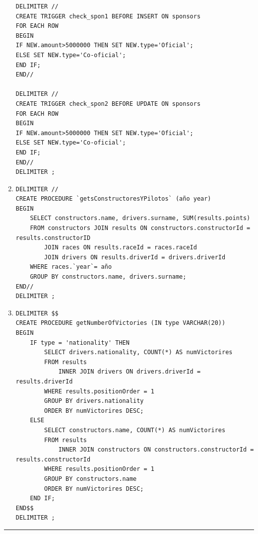 \documentclass[a4paper]{article}
\begin{document}
\begin{enumerate}
\begin{verbatim}
DELIMITER //
CREATE TRIGGER check_spon1 BEFORE INSERT ON sponsors
FOR EACH ROW
BEGIN
IF NEW.amount>5000000 THEN SET NEW.type='Oficial';
ELSE SET NEW.type='Co-oficial';
END IF;
END//

DELIMITER //
CREATE TRIGGER check_spon2 BEFORE UPDATE ON sponsors
FOR EACH ROW
BEGIN
IF NEW.amount>5000000 THEN SET NEW.type='Oficial';
ELSE SET NEW.type='Co-oficial';
END IF;
END//
DELIMITER ;    
    \end{verbatim}
    
    \item 
    \begin{verbatim}
DELIMITER //
CREATE PROCEDURE `getsConstructoresYPilotos` (año year)
BEGIN
    SELECT constructors.name, drivers.surname, SUM(results.points)
    FROM constructors JOIN results ON constructors.constructorId = results.constructorID
		JOIN races ON results.raceId = races.raceId
        JOIN drivers ON results.driverId = drivers.driverId
	WHERE races.`year`= año
    GROUP BY constructors.name, drivers.surname;
END//  
DELIMITER ;
    \end{verbatim}
    
    \item 
    \begin{verbatim}
DELIMITER $$
CREATE PROCEDURE getNumberOfVictories (IN type VARCHAR(20)) 
BEGIN
    IF type = 'nationality' THEN
        SELECT drivers.nationality, COUNT(*) AS numVictorires
        FROM results
            INNER JOIN drivers ON drivers.driverId = results.driverId
        WHERE results.positionOrder = 1
        GROUP BY drivers.nationality
        ORDER BY numVictorires DESC;
    ELSE 
        SELECT constructors.name, COUNT(*) AS numVictorires
        FROM results
            INNER JOIN constructors ON constructors.constructorId = results.constructorId
        WHERE results.positionOrder = 1
        GROUP BY constructors.name
        ORDER BY numVictorires DESC;
    END IF;
END$$
DELIMITER ;   
    \end{verbatim}
\end{enumerate}

\vspace{2em}
\hrule
\doclicenseThis
\end{document}
